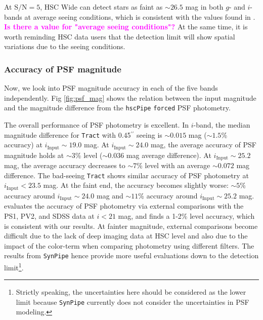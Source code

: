 \documentclass[useamsfonts]{pasj01}
\def\asec{$^{\prime\prime}$}
\def\hscpipe{\texttt{hscPipe}}
\def\synpipe{\texttt{SynPipe}}
\def\forced{\texttt{forced}}
\def\tract{\texttt{Tract}}
\def\s2n{{$\mathrm{S}/\mathrm{N}$}}
\newcommand{\susan}[1]{\textcolor{magenta} {\textbf{#1}}}
\begin{document}
    At \s2n{}$=5$, HSC Wide can detect stars as faint as ${\sim}26.5$ mag in both $g$- and
    $i$-bands at average seeing conditions, which is consistent with the values found
    in \citet{HSCDR1}. \susan{Is there a value for "average seeing conditions"?}
    At the same time, it is worth reminding HSC data users that the detection
    limit will show spatial variations due to the seeing conditions.

\subsubsection{Accuracy of PSF magnitude}

    Now, we look into PSF magnitude accuracy in each of the five bands
    independently.
    Fig \ref{fig:psf_mag} shows the relation between the input magnitude and the
    magnitude difference from the \hscpipe{} \forced{} PSF photometry.

    The overall performance of PSF photometry is excellent.
    In $i$-band, the median magnitude difference for \tract{} with 0.45\asec{} seeing is
     ${\sim}0.015$ mag (${\sim}1.5$\% accuracy) at
    $i_{\mathrm{Input}}{\sim}19.0$ mag.
    At $i_{\mathrm{Input}}{\sim}24.0$ mag, the average accuracy of PSF
    magnitude holds at ${\sim}3$\% level (${\sim}0.036$ mag average difference).
    At $i_{\mathrm{Input}}{\sim}25.2$ mag, the average accuracy decreases to
    ${\sim}7$\% level with an average ${\sim}0.072$ mag difference.
    The bad-seeing \tract{} shows similar accuracy of PSF photometry at
    $i_{\mathrm{Input}}<23.5$ mag.
    At the faint end, the accuracy becomes slightly worse: ${\sim}5$\% accuracy around
    $i_{\mathrm{Input}}{\sim}24.0$ mag and ${\sim}11$\% accuracy around
    $i_{\mathrm{Input}}{\sim}25.2$ mag.
    \citet{HSCDR1} evaluates the accuracy of PSF photometry via external comparisons
    with the PS1, PV2, and SDSS data at $i<21$ mag, and finds a 1-2\% level accuracy,
    which is consistent with our results.
    At fainter magnitude, external comparisons become difficult due to the lack of deep
    imaging data at HSC level and also due to the impact of the color-term when comparing photometry
    using different filters.
    The results from \synpipe{} hence provide more useful evaluations down to the
    detection limit\footnote{Strictly speaking, the uncertainties here should be
    considered as the lower limit because \synpipe{} currently does not consider the uncertainties
    in PSF modeling.}.
\end{document}
